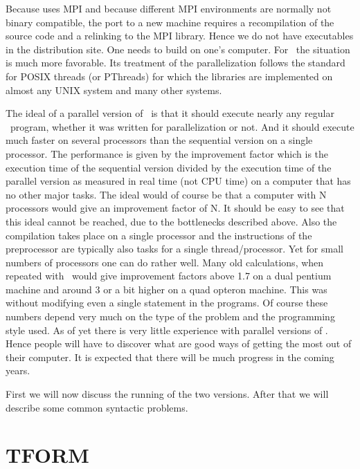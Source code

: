 Because \ParFORM{} uses MPI and because different MPI 
environments are normally not binary compatible, the port to a new machine 
requires a recompilation of the source code and a relinking to the MPI 
library. Hence we do not have executables in the distribution site.
One needs to build \ParFORM{} on one's computer.
For \TFORM\ the situation is much more favorable. Its treatment of the 
parallelization follows the standard for POSIX threads (or 
PThreads) for which the libraries are implemented on almost any 
UNIX system and many other systems.

The ideal of a parallel version of \FORM\ is that it should execute nearly 
any regular \FORM\ program, whether it was written for parallelization or 
not. And it should execute much faster on several processors than the 
sequential version on a single processor. The performance is given by the 
improvement factor which is the execution time of the sequential version 
divided by the execution time of the parallel version as measured in real 
time (not CPU time) on a computer that has no other major tasks. The ideal 
would of course be that a computer with N processors would give an 
improvement factor of N. It should be easy to see that this ideal cannot be 
reached, due to the bottlenecks described above. Also the compilation takes 
place on a single processor and the instructions of the preprocessor are 
typically also tasks for a single thread/processor. Yet for small numbers 
of processors one can do rather well. Many old calculations, when repeated 
with \TFORM\ would give improvement factors above 
1.7 on a dual pentium machine and around 3 or a bit higher 
on a quad opteron machine. This was without modifying even a 
single statement in the programs. Of course these numbers depend very much 
on the type of the problem and the programming style used. As of yet there 
is very little experience with parallel versions of \FORM. Hence people will 
have to discover what are good ways of getting the most out of their 
computer. It is expected that there will be much progress in the coming 
years.

First we will now discuss the running of the two versions. After that we 
will describe some common syntactic problems.


\section{TFORM}
\label{tform}

